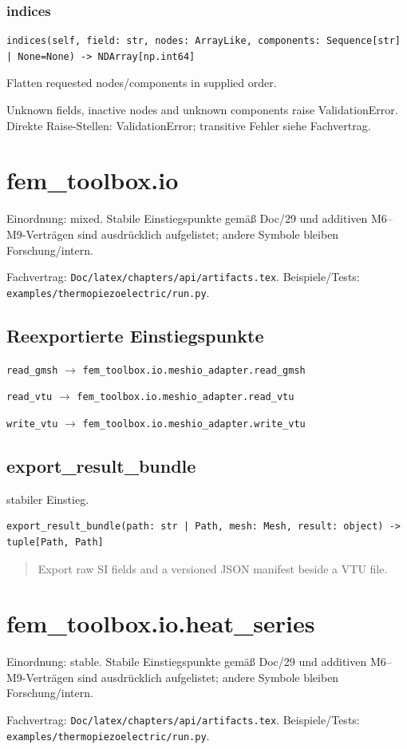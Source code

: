 \subsubsection*{indices}
\begin{lstlisting}
indices(self, field: str, nodes: ArrayLike, components: Sequence[str] | None=None) -> NDArray[np.int64]
\end{lstlisting}
Flatten requested nodes/components in supplied order.\par Unknown fields, inactive nodes and unknown components raise ValidationError.
Direkte Raise-Stellen: ValidationError; transitive Fehler siehe Fachvertrag.
\section{fem\_toolbox.io}
Einordnung: mixed. Stabile Einstiegspunkte gemäß Doc/29 und additiven M6–M9-Verträgen sind ausdrücklich aufgelistet; andere Symbole bleiben Forschung/intern.
\par Fachvertrag: \nolinkurl{Doc/latex/chapters/api/artifacts.tex}. Beispiele/Tests:
\nolinkurl{examples/thermopiezoelectric/run.py}.
\subsection*{Reexportierte Einstiegspunkte}
\noindent\nolinkurl{read_gmsh} $\to$ \nolinkurl{fem_toolbox.io.meshio_adapter.read_gmsh}\par
\noindent\nolinkurl{read_vtu} $\to$ \nolinkurl{fem_toolbox.io.meshio_adapter.read_vtu}\par
\noindent\nolinkurl{write_vtu} $\to$ \nolinkurl{fem_toolbox.io.meshio_adapter.write_vtu}\par
\subsection{export\_result\_bundle}
stabiler Einstieg.
\begin{lstlisting}
export_result_bundle(path: str | Path, mesh: Mesh, result: object) -> tuple[Path, Path]
\end{lstlisting}
\begin{quote}
Export raw SI fields and a versioned JSON manifest beside a VTU file.
\end{quote}
\section{fem\_toolbox.io.heat\_series}
Einordnung: stable. Stabile Einstiegspunkte gemäß Doc/29 und additiven M6–M9-Verträgen sind ausdrücklich aufgelistet; andere Symbole bleiben Forschung/intern.
\par Fachvertrag: \nolinkurl{Doc/latex/chapters/api/artifacts.tex}. Beispiele/Tests:
\nolinkurl{examples/thermopiezoelectric/run.py}.
